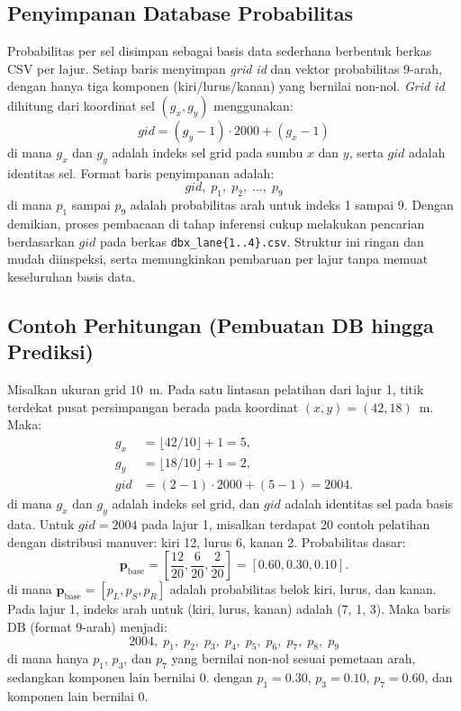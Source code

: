 \documentclass[conference]{IEEEtran}
\begin{document}
\subsection{Penyimpanan Database Probabilitas}
Probabilitas per sel disimpan sebagai basis data sederhana berbentuk berkas CSV per lajur. Setiap baris menyimpan \textit{grid id} dan vektor probabilitas 9-arah, dengan hanya tiga komponen (kiri/lurus/kanan) yang bernilai non-nol. \textit{Grid id} dihitung dari koordinat sel $(g_x,g_y)$ menggunakan:
\begin{equation}
gid = (g_y-1)\cdot 2000 + (g_x-1)
\end{equation}
di mana $g_x$ dan $g_y$ adalah indeks sel grid pada sumbu $x$ dan $y$, serta $gid$ adalah identitas sel.
Format baris penyimpanan adalah:
\begin{equation}
gid,\;p_1,\;p_2,\;...,\;p_9
\end{equation}
di mana $p_1$ sampai $p_9$ adalah probabilitas arah untuk indeks 1 sampai 9.
Dengan demikian, proses pembacaan di tahap inferensi cukup melakukan pencarian berdasarkan $gid$ pada berkas \texttt{dbx\_lane\{1..4\}.csv}. Struktur ini ringan dan mudah diinspeksi, serta memungkinkan pembaruan per lajur tanpa memuat keseluruhan basis data.

\subsection{Contoh Perhitungan (Pembuatan DB hingga Prediksi)}
Misalkan ukuran grid $10$~m. Pada satu lintasan pelatihan dari lajur 1, titik terdekat pusat persimpangan berada pada koordinat $(x,y)=(42,18)$~m. Maka:
\begin{align}
g_x &= \lfloor 42/10 \rfloor + 1 = 5, \\
g_y &= \lfloor 18/10 \rfloor + 1 = 2, \\
gid &= (2-1)\cdot 2000 + (5-1) = 2004.
\end{align}
di mana $g_x$ dan $g_y$ adalah indeks sel grid, dan $gid$ adalah identitas sel pada basis data.
Untuk $gid=2004$ pada lajur 1, misalkan terdapat 20 contoh pelatihan dengan distribusi manuver: kiri 12, lurus 6, kanan 2. Probabilitas dasar:
\begin{equation}
\mathbf{p}_{\text{base}}=\left[\frac{12}{20},\frac{6}{20},\frac{2}{20}\right]=[0.60,0.30,0.10].
\end{equation}
di mana $\mathbf{p}_{\text{base}}=[p_L,p_S,p_R]$ adalah probabilitas belok kiri, lurus, dan kanan.
Pada lajur 1, indeks arah untuk (kiri, lurus, kanan) adalah (7, 1, 3). Maka baris DB (format 9-arah) menjadi:
\begin{equation}
2004,\;p_1,\;p_2,\;p_3,\;p_4,\;p_5,\;p_6,\;p_7,\;p_8,\;p_9
\end{equation}
di mana hanya $p_1$, $p_3$, dan $p_7$ yang bernilai non-nol sesuai pemetaan arah, sedangkan komponen lain bernilai 0.
dengan $p_1=0.30$, $p_3=0.10$, $p_7=0.60$, dan komponen lain bernilai 0.
\end{document}
